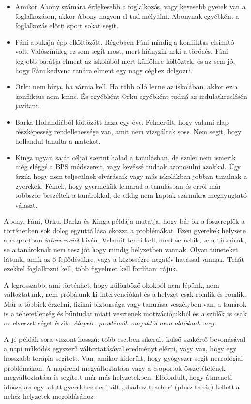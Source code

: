 \begin{itemize}
\item
  Amikor Abony számára érdekesebb a foglalkozás, vagy kevesebb gyerek
  van a foglalkozáson, akkor Abony nagyon el tud mélyülni. Abonynak
  egyébként a foglalkozás előtti sport sokat segít.
\item
  Fáni apukája épp elköltözött. Régebben Fáni mindig a
  konfliktus-elsimító volt. Valószínűleg ez sem segít most, mert
  hiányzik neki a törődés. Fáni legjobb barátja elment az iskolából mert
  külföldre költöztek, és az sem jó, hogy Fáni kedvenc tanára elment egy
  nagy céghez dolgozni.
\item
  Orku nem bírja, ha várnia kell. Ha több olló lenne az iskolában, akkor
  ez a konfliktus nem lenne. És egyébként Orku egyébként tudná az
  indulatkezelésén javítani.
\item
  Barka Hollandiából költözött haza egy éve. Felmerült, hogy valami alap
  részképesség rendellenessége van, amit nem vizsgáltak sose. Nem segít,
  hogy hollandul tanulta a matekot.
\item
  Kinga ugyan saját céljai szerint halad a tanulásban, de szülei nem
  ismerik még eléggé a BPS módszereit, vagy kevéssé tudnak azonosulni
  azokkal. Úgy érzik, hogy nem teljesülnek elvárásaik vagy más
  iskolákban jobban tanulnak a gyerekek. Félnek, hogy gyermekük lemarad
  a tanulásban és erről már többször beszéltek a tanárokkal, de eddig
  nem kaptak számukra megnyugtató választ.
\end{itemize}

Abony, Fáni, Orku, Barka és Kinga példája mutatja, hogy bár ők a
főszereplők a történetben sok dolog együttállása okozza a problémákat.
Ezen gyerekek helyzete a csoportban \emph{intervenciót} kíván. Valamit
tenni kell, mert se nekik, se a társainak, se a tanároknak nem tesz jót
hogy mindig helyzetben vannak. Olyan tüneteket látunk, amik az ő
fejlődésükre, vagy a közösségre negatív hatással vannak. Tehát ezekkel
foglalkozni kell, több figyelmet kell fordítani rájuk.

A legrosszabb, ami történhet, hogy különböző okokból nem lépünk, nem
változtatunk, nem próbálunk ki intervenciókat és a helyzet csak romlik
és romlik. Már a többiek érzelmi, fizikai biztonsága vagy tanulása
veszélyben van, a tanárok is a tehetetlenség és bűntudat miatt vesztenek
motivációjukból és a szülők is csak az elveszettséget érzik.
\emph{Alapelv: problémák maguktól nem oldódnak meg.}

A jó példák sora viszont hosszú: több esetben sikerült külső szakértő
bevonásával a napi működés egyszerű változtatásával eredményt elérni,
vagy van, hogy egy hosszabb terápia segített. Van, amikor kiderült, hogy
gyógyszer segít neurológiai problémákon. A napirend megváltoztatása vagy
a csoportok összetételének megváltoztatása is segített már más
helyzetekben. Előfordult, hogy átmeneti időszakra egy adott gyerekhez
dedikált „shadow teacher" (plusz tanár) kellett a nehéz helyzetek
megoldásához.

